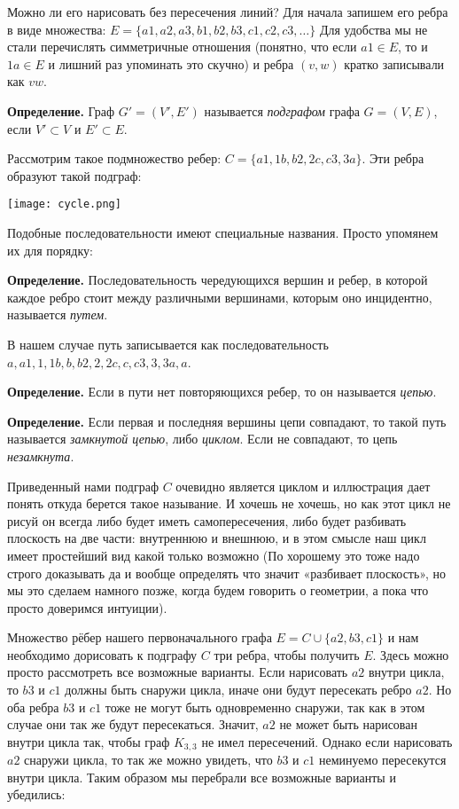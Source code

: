 Можно ли его нарисовать без пересечения линий? Для начала запишем его ребра в виде множества: $E = \{a1, a2, a3, b1, b2, b3, c1, c2, c3, \ldots\}$ Для удобства мы не стали перечислять симметричные отношения (понятно, что если $a1\in E$, то и $1a \in E$ и лишний раз упоминать это скучно) и ребра $(v, w)$ кратко записывали как $vw$.

{\bfseries Определение.} Граф $G' = (V', E')$ называется {\slshape подграфом} графа $G = (V, E)$, если $V' \subset V$ и $E' \subset E$.

Рассмотрим такое подмножество ребер: $C = \{a1, 1b, b2, 2c, c3, 3a\}$. Эти ребра образуют такой подграф:

\texttt{[image: cycle.png]}

Подобные последовательности имеют специальные названия. Просто упомянем их для порядку:

{\bfseries Определение.} Последовательность чередующихся вершин и ребер, в которой каждое ребро стоит между различными вершинами, которым оно инцидентно, называется {\slshape путем}.

В нашем случае путь записывается как последовательность $a, a1, 1, 1b, b, b2, 2, 2c, c, c3, 3, 3a, a$.

{\bfseries Определение.} Если в пути нет повторяющихся ребер, то он называется {\slshape цепью}.

{\bfseries Определение.} Если первая и последняя вершины цепи совпадают, то такой путь называется {\slshape замкнутой цепью}, либо {\slshape циклом}. Если не совпадают, то цепь {\slshape незамкнута}.

Приведенный нами подграф $C$ очевидно является циклом и иллюстрация дает понять откуда берется такое называние. И хочешь не хочешь, но как этот цикл не рисуй он всегда либо будет иметь самопересечения, либо будет разбивать плоскость на две части: внутреннюю и внешнюю, и в этом смысле наш цикл имеет простейший вид какой только возможно (По хорошему это тоже надо строго доказывать да и вообще определять что значит «разбивает плоскость», но мы это сделаем намного позже, когда будем говорить о геометрии, а пока что просто доверимся интуиции).

Множество рёбер нашего первоначального графа $E = C \cup \{a2, b3, c1\}$ и нам необходимо дорисовать к подграфу $C$ три ребра, чтобы получить $E$. Здесь можно просто рассмотреть все возможные варианты. Если нарисовать $a2$ внутри цикла, то $b3$ и $c 1$ должны быть снаружи цикла, иначе они будут пересекать ребро $a2$. Но оба ребра $b3$ и $c 1$ тоже не могут быть одновременно снаружи, так как в этом случае они так же будут пересекаться. Значит, $a2$ не может быть нарисован внутри цикла так, чтобы граф $K_{3, 3}$ не имел пересечений. Однако если нарисовать $a2$ снаружи цикла, то так же можно увидеть, что $b3$ и $c 1$ неминуемо пересекутся внутри цикла. Таким образом мы перебрали все возможные варианты и убедились:


